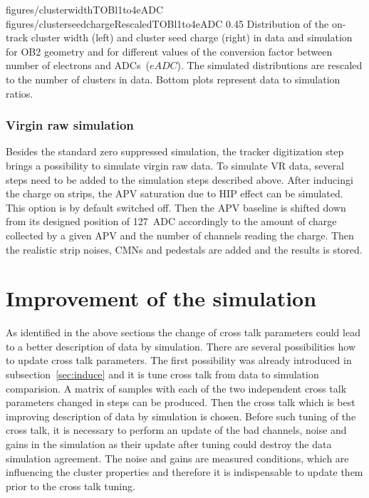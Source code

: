                  {figures/clusterwidthTOBl1to4eADC}
                 {figures/clusterseedchargeRescaledTOBl1to4eADC} %
                 {0.45}       %
                 { Distribution of the on-track cluster width (left) and cluster seed charge (right) in data and simulation for OB2 geometry and for different values of the conversion factor between number of electrons and ADCs~($eADC$).  The simulated distributions are rescaled to the number of clusters in data.  Bottom plots represent data to simulation ratios. }

 
\subsubsection{Virgin raw simulation~\label{sec:VRsimu}}

Besides the standard zero suppressed simulation, the tracker digitization step brings a possibility to simulate virgin raw data. To simulate VR data, several steps need to be added to the simulation steps described above. After inducingi the charge on strips, the APV saturation due to HIP effect can be simulated. This option is by default switched off. Then the APV baseline is shifted down from its designed position of 127~ADC accordingly to the amount of charge collected by a given APV and the number of channels reading the charge. Then the realistic strip noises, CMNs and pedestals are added and the results is stored.


\newpage

\section{Improvement of the simulation}

As identified in the above sections the change of cross talk parameters could lead to a better description of data by simulation. There are several possibilities how to update cross talk parameters. The first possibility was already introduced in subsection~\ref{sec:induce} and it is tune cross talk from data to simulation comparision. A matrix of samples with each of the two independent cross talk parameters changed in steps can be produced. Then the cross talk which is best improving description of data by simulation is chosen. Before such tuning of the cross talk, it is necessary to perform an update of the bad channels, noise and gains in the simulation as their update after tuning could destroy the data simulation agreement. The noise and gains are measured conditions, which are influencing the cluster properties and therefore it is indispensable to update them prior to the cross talk tuning.


